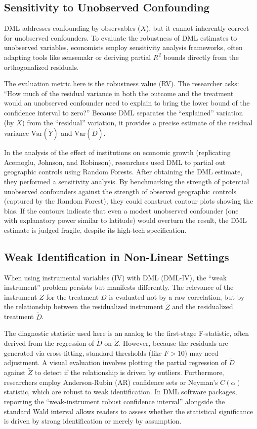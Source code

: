 \documentclass[12pt,a4paper]{article}
\begin{document}
\subsection{Sensitivity to Unobserved Confounding}

DML addresses confounding by observables ($X$), but it cannot inherently correct for unobserved confounders. To evaluate the robustness of DML estimates to unobserved variables, economists employ sensitivity analysis frameworks, often adapting tools like sensemakr or deriving partial $R^2$ bounds directly from the orthogonalized residuals.

The evaluation metric here is the robustness value (RV). The researcher asks: ``How much of the residual variance in both the outcome and the treatment would an unobserved confounder need to explain to bring the lower bound of the confidence interval to zero?'' Because DML separates the ``explained'' variation (by $X$) from the ``residual'' variation, it provides a precise estimate of the residual variance $\text{Var}(\tilde{Y})$ and $\text{Var}(\tilde{D})$.

In the analysis of the effect of institutions on economic growth (replicating Acemoglu, Johnson, and Robinson), researchers used DML to partial out geographic controls using Random Forests. After obtaining the DML estimate, they performed a sensitivity analysis. By benchmarking the strength of potential unobserved confounders against the strength of observed geographic controls (captured by the Random Forest), they could construct contour plots showing the bias. If the contours indicate that even a modest unobserved confounder (one with explanatory power similar to latitude) would overturn the result, the DML estimate is judged fragile, despite its high-tech specification.

\subsection{Weak Identification in Non-Linear Settings}

When using instrumental variables (IV) with DML (DML-IV), the ``weak instrument'' problem persists but manifests differently. The relevance of the instrument $Z$ for the treatment $D$ is evaluated not by a raw correlation, but by the relationship between the residualized instrument $\tilde{Z}$ and the residualized treatment $\tilde{D}$.

The diagnostic statistic used here is an analog to the first-stage F-statistic, often derived from the regression of $\tilde{D}$ on $\tilde{Z}$. However, because the residuals are generated via cross-fitting, standard thresholds (like $F > 10$) may need adjustment. A visual evaluation involves plotting the partial regression of $\tilde{D}$ against $\tilde{Z}$ to detect if the relationship is driven by outliers. Furthermore, researchers employ Anderson-Rubin (AR) confidence sets or Neyman's $C(\alpha)$ statistic, which are robust to weak identification. In DML software packages, reporting the ``weak-instrument robust confidence interval'' alongside the standard Wald interval allows readers to assess whether the statistical significance is driven by strong identification or merely by assumption.
\end{document}

